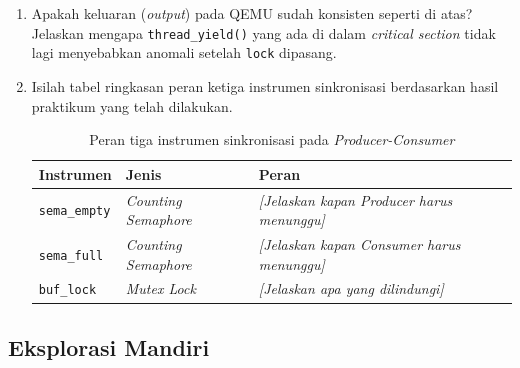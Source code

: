 \begin{enumerate}
	\item Apakah keluaran (\textit{output}) pada QEMU sudah konsisten seperti di atas? Jelaskan mengapa \texttt{thread\_yield()} yang ada di dalam \textit{critical section} tidak lagi menyebabkan anomali setelah \texttt{lock} dipasang.

	\item Isilah tabel ringkasan peran ketiga instrumen sinkronisasi berdasarkan hasil praktikum yang telah dilakukan.

	      \begin{table}[htbp]
		      \centering
		      \caption{Peran tiga instrumen sinkronisasi pada \textit{Producer-Consumer}}
		      \begin{tabulary}{\textwidth}{|l|l|L|}
			      \hline
			      \textbf{Instrumen} & \textbf{Jenis} & \textbf{Peran} \\ \hline
			      \texttt{sema\_empty}
			      & \textit{Counting Semaphore}
			      & \textit{[Jelaskan kapan Producer harus menunggu]} \\ \hline
			      \texttt{sema\_full}
			      & \textit{Counting Semaphore}
			      & \textit{[Jelaskan kapan Consumer harus menunggu]} \\ \hline
			      \texttt{buf\_lock}
			      & \textit{Mutex Lock}
			      & \textit{[Jelaskan apa yang dilindungi]} \\ \hline
		      \end{tabulary}
	      \end{table}

\end{enumerate}

\subsection{Eksplorasi Mandiri}

